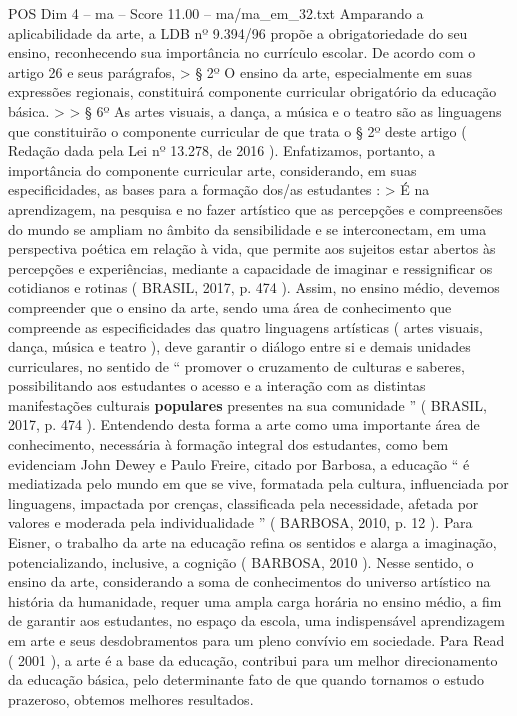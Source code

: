 \begin{textsample}{POS Dim 4 – ma – Score 11.00 – ma/ma\_em\_32.txt}
Amparando a aplicabilidade da arte, a LDB nº 9.394/96 propõe a obrigatoriedade do seu ensino, reconhecendo sua importância no currículo escolar.
De acordo com o artigo 26 e seus parágrafos, > § 2º O ensino da arte, especialmente em suas expressões regionais, constituirá componente curricular obrigatório da educação básica. > > § 6º As artes visuais, a dança, a música e o teatro são as linguagens que constituirão o componente curricular de que trata o § 2º deste artigo ( Redação dada pela Lei nº 13.278, de 2016 ).
Enfatizamos, portanto, a importância do componente curricular arte, considerando, em suas especificidades, as bases para a formação dos/as estudantes : > É na aprendizagem, na pesquisa e no fazer artístico que as percepções e compreensões do mundo se ampliam no âmbito da sensibilidade e se interconectam, em uma perspectiva poética em relação à vida, que permite aos sujeitos estar abertos às percepções e experiências, mediante a capacidade de imaginar e ressignificar os cotidianos e rotinas ( BRASIL, 2017, p. 474 ).
Assim, no ensino médio, devemos compreender que o ensino da arte, sendo uma área de conhecimento que compreende as especificidades das quatro linguagens artísticas ( artes visuais, dança, música e teatro ), deve garantir o diálogo entre si e demais unidades curriculares, no sentido de “ promover o cruzamento de culturas e saberes, possibilitando aos estudantes o acesso e a interação com as distintas manifestações culturais \textbf{populares} presentes na sua comunidade ” ( BRASIL, 2017, p. 474 ).
Entendendo desta forma a arte como uma importante área de conhecimento, necessária à formação integral dos estudantes, como bem evidenciam John Dewey e Paulo Freire, citado por Barbosa, a educação “ é mediatizada pelo mundo em que se vive, formatada pela cultura, influenciada por linguagens, impactada por crenças, classificada pela necessidade, afetada por valores e moderada pela individualidade ” ( BARBOSA, 2010, p. 12 ).
Para Eisner, o trabalho da arte na educação refina os sentidos e alarga a imaginação, potencializando, inclusive, a cognição ( BARBOSA, 2010 ).
Nesse sentido, o ensino da arte, considerando a soma de conhecimentos do universo artístico na história da humanidade, requer uma ampla carga horária no ensino médio, a fim de garantir aos estudantes, no espaço da escola, uma indispensável aprendizagem em arte e seus desdobramentos para um pleno convívio em sociedade.
Para Read ( 2001 ), a arte é a base da educação, contribui para um melhor direcionamento da educação básica, pelo determinante fato de que quando tornamos o estudo prazeroso, obtemos melhores resultados.

\end{textsample}
